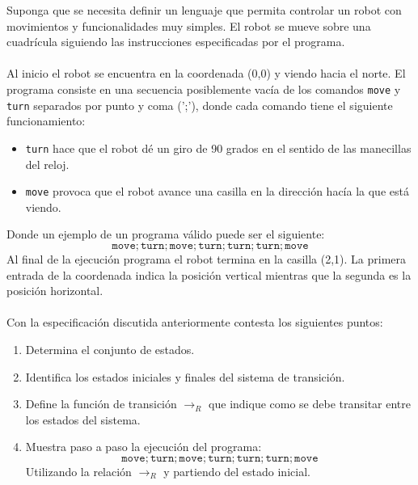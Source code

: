     \begin{exercise}
        Suponga que se necesita definir un lenguaje que permita controlar un robot con movimientos
        y funcionalidades muy simples. El robot se mueve sobre una cuadrícula siguiendo las instrucciones especificadas por el programa. \\\\
        Al inicio el robot se encuentra en la coordenada (0,0) y viendo hacia el norte. El programa consiste en una secuencia posiblemente 
        vacía de los comandos \texttt{move} y \texttt{turn} separados por punto y coma (';'), donde cada comando tiene el siguiente funcionamiento:\\
    
        \begin{itemize}
            \item \texttt{turn} hace que el robot dé un giro de 90 grados en el sentido de las manecillas del reloj.
            \item \texttt{move} provoca que el robot avance una casilla en la dirección hacía la que está viendo.\\
        \end{itemize}

        Donde un ejemplo de un programa válido puede ser el siguiente:
        \[   \texttt{move};\texttt{turn};\texttt{move};\texttt{turn};\texttt{turn};\texttt{turn};\texttt{move} \]
        Al final de la ejecución programa el robot termina en la casilla (2,1). La primera entrada de la coordenada
        indica la posición vertical mientras que la segunda es la posición horizontal.\\\\

        Con la especificación discutida anteriormente contesta los siguientes puntos:\\

        \begin{enumerate}
            \item Determina el conjunto de estados. 
            \item Identifica los estados iniciales y finales del sistema de transición.
            \item Define la función de transición $\rightarrow_R$ que indique como se debe transitar entre los estados del sistema.
            \item Muestra paso a paso la ejecución del programa:
                  \[  \texttt{move};\texttt{turn};\texttt{move};\texttt{turn};\texttt{turn};\texttt{turn};\texttt{move} \]
                  Utilizando la relación $\rightarrow_R$ y partiendo del estado inicial.
         \end{enumerate}

    \end{exercise}


